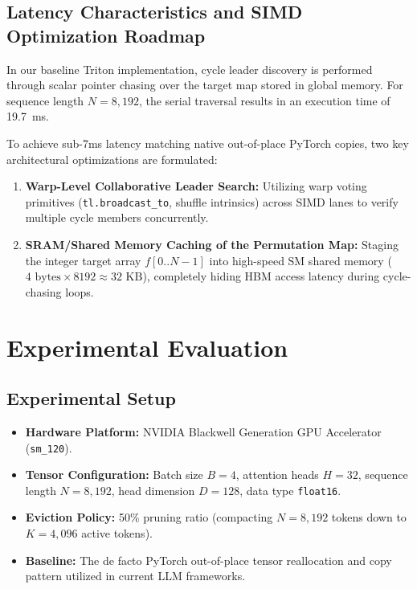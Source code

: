 \documentclass[journal,10pt,twocolumn]{article}
\begin{document}
\subsection{Latency Characteristics and SIMD Optimization Roadmap}
In our baseline Triton implementation, cycle leader discovery is performed through scalar pointer chasing over the target map stored in global memory. For sequence length $N = 8,192$, the serial traversal results in an execution time of 19.7~ms. 

To achieve sub-7ms latency matching native out-of-place PyTorch copies, two key architectural optimizations are formulated:
\begin{enumerate}
    \item \textbf{Warp-Level Collaborative Leader Search:} Utilizing warp voting primitives (\texttt{tl.broadcast\_to}, shuffle intrinsics) across SIMD lanes to verify multiple cycle members concurrently.
    \item \textbf{SRAM/Shared Memory Caching of the Permutation Map:} Staging the integer target array $f[0..N-1]$ into high-speed SM shared memory ($4 \text{ bytes} \times 8192 \approx 32\text{ KB}$), completely hiding HBM access latency during cycle-chasing loops.
\end{enumerate}

\section{Experimental Evaluation}
\label{sec:eval}

\subsection{Experimental Setup}
\begin{itemize}
    \item \textbf{Hardware Platform:} NVIDIA Blackwell Generation GPU Accelerator (\texttt{sm\_120}).
    \item \textbf{Tensor Configuration:} Batch size $B = 4$, attention heads $H = 32$, sequence length $N = 8,192$, head dimension $D = 128$, data type \texttt{float16}.
    \item \textbf{Eviction Policy:} 50\% pruning ratio (compacting $N = 8,192$ tokens down to $K = 4,096$ active tokens).
    \item \textbf{Baseline:} The de facto PyTorch out-of-place tensor reallocation and copy pattern utilized in current LLM frameworks.
\end{itemize}
\end{document}
